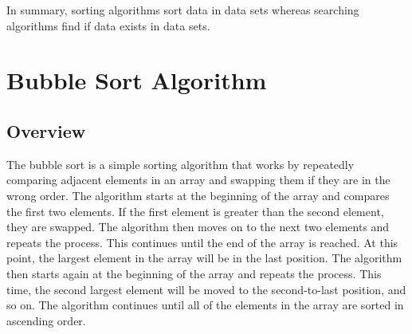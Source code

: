 \documentclass[a4paper,9pt]{article}
\begin{document}
\noindent In summary, sorting algorithms sort data in data sets whereas searching algorithms find if data exists in data sets.

\clearpage

\section*{Bubble Sort Algorithm}

\subsection*{Overview}

The bubble sort is a simple sorting algorithm that works by repeatedly comparing adjacent elements in an array and swapping them if they are in the wrong order. The algorithm starts at the beginning of the array and compares the first two elements. If the first element is greater than the second element, they are swapped. The algorithm then moves on to the next 
two elements and repeats the process. This continues until the end of the array is reached. At this point, the largest element in the array will be in the last position. The algorithm then starts again at the beginning of the array and repeats the process. This time, the second largest element will be moved to the second-to-last position, and so on. The 
algorithm continues until all of the elements in the array are sorted in ascending order.
\end{document}
